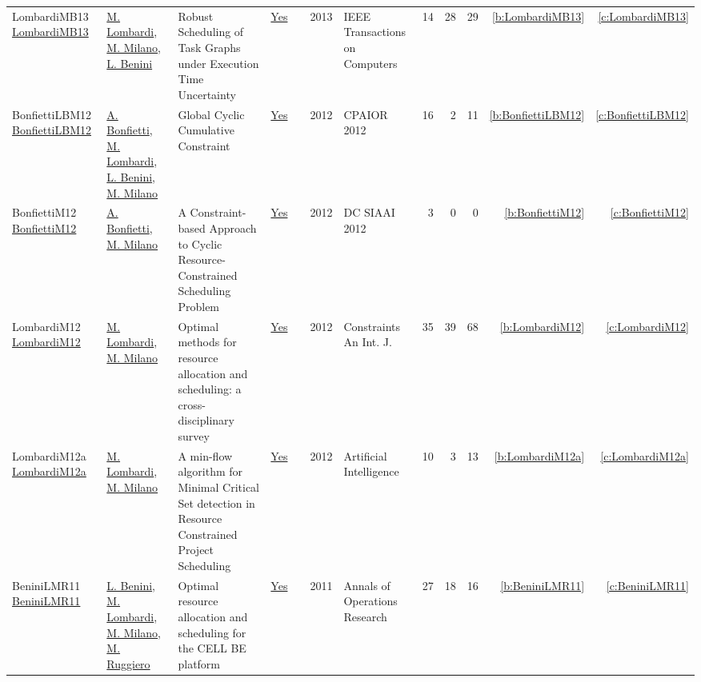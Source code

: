 {\begin{longtable}{>{\raggedright\arraybackslash}p{3cm}>{\raggedright\arraybackslash}p{6cm}>{\raggedright\arraybackslash}p{6.5cm}rrrp{2.5cm}rrrrr}
LombardiMB13 \href{http://dx.doi.org/10.1109/tc.2011.203}{LombardiMB13} & \hyperref[auth:a143]{M. Lombardi}, \hyperref[auth:a144]{M. Milano}, \hyperref[auth:a248]{L. Benini} & Robust Scheduling of Task Graphs under Execution Time Uncertainty & \href{../works/LombardiMB13.pdf}{Yes} & \cite{LombardiMB13} & 2013 & IEEE Transactions on Computers & 14 & 28 & 29 & \ref{b:LombardiMB13} & \ref{c:LombardiMB13}\\
BonfiettiLBM12 \href{https://doi.org/10.1007/978-3-642-29828-8\_6}{BonfiettiLBM12} & \hyperref[auth:a204]{A. Bonfietti}, \hyperref[auth:a143]{M. Lombardi}, \hyperref[auth:a248]{L. Benini}, \hyperref[auth:a144]{M. Milano} & Global Cyclic Cumulative Constraint & \href{../works/BonfiettiLBM12.pdf}{Yes} & \cite{BonfiettiLBM12} & 2012 & CPAIOR 2012 & 16 & 2 & 11 & \ref{b:BonfiettiLBM12} & \ref{c:BonfiettiLBM12}\\
BonfiettiM12 \href{https://ceur-ws.org/Vol-926/paper2.pdf}{BonfiettiM12} & \hyperref[auth:a204]{A. Bonfietti}, \hyperref[auth:a144]{M. Milano} & A Constraint-based Approach to Cyclic Resource-Constrained Scheduling Problem & \href{../works/BonfiettiM12.pdf}{Yes} & \cite{BonfiettiM12} & 2012 & DC SIAAI 2012 & 3 & 0 & 0 & \ref{b:BonfiettiM12} & \ref{c:BonfiettiM12}\\
LombardiM12 \href{https://doi.org/10.1007/s10601-011-9115-6}{LombardiM12} & \hyperref[auth:a143]{M. Lombardi}, \hyperref[auth:a144]{M. Milano} & Optimal methods for resource allocation and scheduling: a cross-disciplinary survey & \href{../works/LombardiM12.pdf}{Yes} & \cite{LombardiM12} & 2012 & Constraints An Int. J. & 35 & 39 & 68 & \ref{b:LombardiM12} & \ref{c:LombardiM12}\\
LombardiM12a \href{https://doi.org/10.1016/j.artint.2011.12.001}{LombardiM12a} & \hyperref[auth:a143]{M. Lombardi}, \hyperref[auth:a144]{M. Milano} & A min-flow algorithm for Minimal Critical Set detection in Resource Constrained Project Scheduling & \href{../works/LombardiM12a.pdf}{Yes} & \cite{LombardiM12a} & 2012 & Artificial Intelligence & 10 & 3 & 13 & \ref{b:LombardiM12a} & \ref{c:LombardiM12a}\\
BeniniLMR11 \href{https://doi.org/10.1007/s10479-010-0718-x}{BeniniLMR11} & \hyperref[auth:a248]{L. Benini}, \hyperref[auth:a143]{M. Lombardi}, \hyperref[auth:a144]{M. Milano}, \hyperref[auth:a727]{M. Ruggiero} & Optimal resource allocation and scheduling for the {CELL} {BE} platform & \href{../works/BeniniLMR11.pdf}{Yes} & \cite{BeniniLMR11} & 2011 & Annals of Operations Research & 27 & 18 & 16 & \ref{b:BeniniLMR11} & \ref{c:BeniniLMR11}\\

\end{longtable}}
